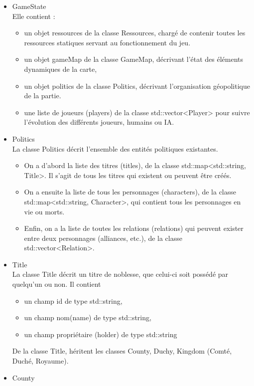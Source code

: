 \documentclass[a4paper,12pt]{article}
\begin{document}
\begin{itemize}
\item GameState\\
Elle contient :
\begin{itemize}
\item un objet ressources de la classe Ressources, chargé de contenir toutes les ressources statiques servant au fonctionnement du jeu. 
\item un objet gameMap de la classe GameMap, décrivant l'état des éléments dynamiques de la carte, 
\item un objet politics de la classe Politics, décrivant l'organisation géopolitique de la partie. 
\item une liste de joueurs (players) de la classe std::vector<Player> pour suivre l'évolution des différents joueurs, humains ou IA.
\end{itemize}
\item Politics\\
La classe Politics décrit l'ensemble des entités politiques existantes. 
\begin{itemize}
\item On a d'abord la liste des titres (titles), de la classe std::map<std::string, Title>. Il s'agit de tous les titres qui existent ou peuvent être créés. 
\item On a ensuite la liste de tous les personnages (characters), de la classe std::map<std::string, Character>, qui contient tous les personnages en vie ou morts. 
\item Enfin, on a la liste de toutes les relations (relations) qui peuvent exister entre deux personnages (alliances, etc.), de la classe std::vector<Relation>. 
\end{itemize}
\item Title\\
La classe Title décrit un titre de noblesse, que celui-ci soit possédé par quelqu'un ou non. Il contient
\begin{itemize}
\item un champ id de type std::string,
\item un champ nom(name) de type std::string,
\item un champ propriétaire (holder) de type std::string
\end{itemize}
De la classe Title, héritent les classes County, Duchy, Kingdom (Comté, Duché, Royaume). 
\item County\\
\begin{itemize}

\end{itemize}
\end{itemize}
\end{document}
